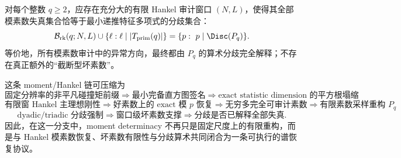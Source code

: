 \begin{conjecture}[分歧即失真原理]\label{conj:conclusion-resonance-window-ramification-equals-distortion}
对每个整数 \(q\ge 2\)，应存在充分大的有限 Hankel 审计窗口 \((N,L)\)，使得其全部模素数失真集合恰等于最小递推特征多项式的分歧集合：
\[
\mathcal B_{\mathrm{rk}}(q;N,L)
\cup
\{\ell:\ell\mid |T_{\mathrm{prim}}(q)|\}
=
\{p:\ p\mid \Disc(P_q)\}.
\]
等价地，所有模素数审计中的异常方向，最终都由 \(P_q\) 的算术分歧完全解释；不存在真正额外的“截断型坏素数”。
\end{conjecture}

这条 moment/Hankel 链可压缩为
\[
\boxed{
\text{固定分辨率的非平凡碰撞矩前缀}
\Longrightarrow
\text{最小完备直方图签名}
\Longrightarrow
\text{exact statistic dimension 的平方根塌缩}
}
\]
\[
\boxed{
\text{有限窗 Hankel 主理想刚性}
\Longrightarrow
\text{好素数上的 exact 模 }p\text{ 恢复}
\Longrightarrow
\text{无穷多完全可审计素数}
\Longrightarrow
\text{有限素数采样重构 }P_q
}
\]
\[
\boxed{
\text{dyadic/triadic 分歧强制}
\Longrightarrow
\text{窗口级坏素数支撑}
\Longrightarrow
\text{分歧是否已解释全部失真}
}.
\]
因此，在这一分支中，moment determinacy 不再只是固定尺度上的有限重构，而是与 Hankel 模素数恢复、坏素数有限性与分歧算术共同闭合为一条可执行的谱恢复协议。
